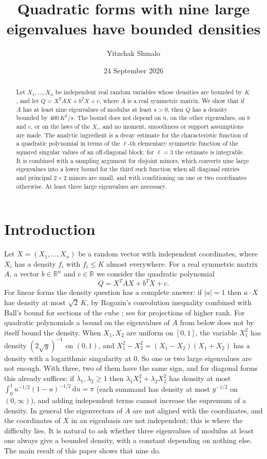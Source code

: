 \documentclass[11pt]{amsart}
\title{Quadratic forms with nine large eigenvalues have bounded densities}
\author{Yitzchak Shmalo}
\date{24 September 2026}
\numberwithin{equation}{section}
\theoremstyle{definition}
\theoremstyle{remark}
\newcommand{\R}{\mathbb R}
\newcommand{\1}{\mathbf 1}
\newcommand{\dd}{\,\mathrm d}
\newcommand{\abs}[1]{\lvert #1\rvert}
\begin{document}
\begin{abstract}
Let $X_1,\dots,X_n$ be independent real random variables whose densities are bounded by $K$, and let $Q=X^{T}AX+b^{T}X+c$, where $A$ is a real symmetric matrix. We show that if $A$ has at least nine eigenvalues of modulus at least $s>0$, then $Q$ has a density bounded by $400\,K^2/s$. The bound does not depend on $n$, on the other eigenvalues, on $b$ and $c$, or on the laws of the $X_i$, and no moment, smoothness or support assumptions are made. The analytic ingredient is a decay estimate for the characteristic function of a quadratic polynomial in terms of the $\ell$-th elementary symmetric function of the squared singular values of an off-diagonal block; for $\ell=3$ the estimate is integrable. It is combined with a sampling argument for disjoint minors, which converts nine large eigenvalues into a lower bound for the third such function when all diagonal entries and principal $2\times2$ minors are small, and with conditioning on one or two coordinates otherwise. At least three large eigenvalues are necessary.
\end{abstract}

\maketitle

\section{Introduction}\label{sec:intro}

Let $X=(X_1,\dots,X_n)$ be a random vector with independent coordinates, where $X_i$ has a density $f_i$ with $f_i\le K$ almost everywhere. For a real symmetric matrix $A$, a vector $b\in\R^n$ and $c\in\R$ we consider the quadratic polynomial
\[
Q=X^{T}AX+b^{T}X+c .
\]
For linear forms the density question has a complete answer: if $\abs{a}=1$ then $a\cdot X$ has density at most $\sqrt2\,K$, by Rogozin's convolution inequality \cite{Rogozin} combined with Ball's bound for sections of the cube \cite{Ball}; see \cite{RV,LPP} for projections of higher rank. For quadratic polynomials a bound on the eigenvalues of $A$ from below does not by itself bound the density. When $X_1,X_2$ are uniform on $[0,1]$, the variable $X_1^2$ has density $(2\sqrt y)^{-1}$ on $(0,1)$, and $X_1^2-X_2^2=(X_1-X_2)(X_1+X_2)$ has a density with a logarithmic singularity at $0$. So one or two large eigenvalues are not enough. With three, two of them have the same sign, and for diagonal forms this already suffices: if $\lambda_1,\lambda_2\ge1$ then $\lambda_1X_1^2+\lambda_2X_2^2$ has density at most $\int_0^1u^{-1/2}(1-u)^{-1/2}\dd u=\pi$ (each summand has density at most $y^{-1/2}$ on $(0,\infty)$), and adding independent terms cannot increase the supremum of a density. In general the eigenvectors of $A$ are not aligned with the coordinates, and the coordinates of $X$ in an eigenbasis are not independent; this is where the difficulty lies. It is natural to ask whether three eigenvalues of modulus at least one always give a bounded density, with a constant depending on nothing else. The main result of this paper shows that nine do.
\end{document}
